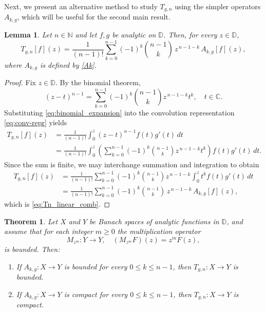 \documentclass[preprint,12pt]{elsarticle}
\numberwithin{equation}{section}
\newtheorem{theorem}{Theorem}[section]
\newtheorem{lemma}{Lemma}[section]
\theoremstyle{remark}
\begin{document}
Next, we present an alternative method to study $T_{g,n}$ using the simpler operators $A_{k,g}$,
which will be useful for the second main result.


\begin{lemma}\label{lem:fin dec}
Let $n\in\mathbb{N}$ and let $f,g$ be analytic on $\mathbb{D}$. Then, for every
$z\in\mathbb{D}$,
\begin{equation}\label{eq:Tn_linear_comb}
T_{g,n}[f](z)
=\frac{1}{(n-1)!}\sum_{k=0}^{n-1}
(-1)^k\binom{n-1}{k}\,z^{\,n-1-k}\,A_{k,g}[f](z),
\end{equation}
where $A_{k,g}$ is defined by \eqref{Ak}.
\end{lemma}

\begin{proof}
Fix $z\in\mathbb{D}$. By the binomial theorem,
\begin{equation}\label{eq:binomial_expansion}
(z-t)^{n-1}=\sum_{k=0}^{n-1}(-1)^k\binom{n-1}{k} z^{\,n-1-k} t^k,
\quad t\in\mathbb{C}.
\end{equation}
Substituting \eqref{eq:binomial_expansion} into the convolution representation
\eqref{eq:conv-repr} yields
\begin{align*}
T_{g,n}[f](z)
&=\frac{1}{(n-1)!}\int_0^z (z-t)^{n-1} f(t)g'(t)\,dt\\
&=\frac{1}{(n-1)!}\int_0^z
\left(\sum_{k=0}^{n-1}(-1)^k\binom{n-1}{k} z^{\,n-1-k} t^k\right) f(t)g'(t)\,dt.
\end{align*}
Since the sum is finite, we may interchange summation and integration to obtain
\begin{align*}
T_{g,n}[f](z)
&=\frac{1}{(n-1)!}\sum_{k=0}^{n-1}(-1)^k\binom{n-1}{k} z^{\,n-1-k}
\int_0^z t^k f(t)g'(t)\,dt\\
&=\frac{1}{(n-1)!}\sum_{k=0}^{n-1}(-1)^k\binom{n-1}{k}\,z^{\,n-1-k}\,A_{k,g}[f](z),
\end{align*}
which is \eqref{eq:Tn_linear_comb}.
\end{proof}


\begin{theorem}\label{thm:Tn_decomposition_revised}
Let $X$ and $Y$ be Banach spaces of analytic functions in $\mathbb{D}$, and assume that
for each integer $m\ge0$ the multiplication operator
\begin{equation*}
M_{z^m}:Y\to Y,\quad (M_{z^m}F)(z)=z^mF(z),
\end{equation*}
is bounded. Then:
\begin{enumerate}
\item[(a)] If $A_{k,g}:X\to Y$ is bounded for every $0\le k\le n-1$, then $T_{g,n}:X\to Y$ is bounded.
\item[(b)] If $A_{k,g}:X\to Y$ is compact for every $0\le k\le n-1$, then $T_{g,n}:X\to Y$ is compact.
\end{enumerate}
\end{theorem}
\end{document}
